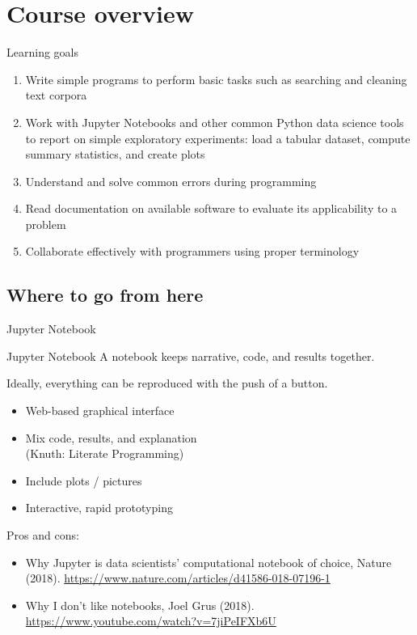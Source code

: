 \documentclass[aspectratio=169,usenames,dvipsnames]{beamer}
\begin{document}
\section{Course overview}
\frame{\tableofcontents[currentsection]}

\begin{frame}{Learning goals}
    \begin{enumerate}
        \item Write simple programs to perform basic tasks such as searching
            and cleaning text corpora
        \item Work with Jupyter Notebooks and other common Python data science
            tools to report on simple exploratory experiments:
            load a tabular dataset, compute summary statistics,
            and create plots
        \item Understand and solve common errors during programming
        \item Read documentation on available software to evaluate its
            applicability to a problem
        \item Collaborate effectively with programmers using proper terminology
    \end{enumerate}
\end{frame}

\subsection{Where to go from here}
\begin{frame}{Jupyter Notebook}
    \begin{block}{Jupyter Notebook}
        A notebook keeps narrative, code, and results together.

        Ideally, everything can be reproduced with the push of a button.
    \end{block}
    \begin{itemize}
        \item Web-based graphical interface
        \item Mix code, results, and explanation \\
                (Knuth: Literate Programming)
        \item Include plots / pictures
        \item Interactive, rapid prototyping
    \end{itemize}

    \pause
    Pros and cons:
    \begin{itemize}
        \item Why Jupyter is data scientists' computational notebook of choice,
            Nature (2018). \url{https://www.nature.com/articles/d41586-018-07196-1}
        \item Why I don't like notebooks, Joel Grus (2018).
            \url{https://www.youtube.com/watch?v=7jiPeIFXb6U}
    \end{itemize}
\end{frame}
\end{document}
